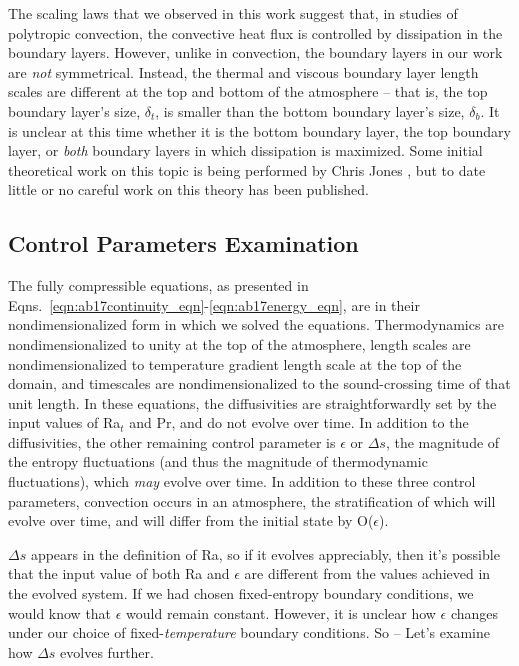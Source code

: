 The scaling laws that we observed in this work suggest that, in studies of polytropic convection, the convective heat flux is controlled by dissipation in the boundary layers.
However, unlike in \RB convection, the boundary layers in our work are \emph{not} symmetrical.
Instead, the thermal and viscous boundary layer length scales are different at the top and bottom of the atmosphere -- that is, the top boundary layer's size, $\delta_t$, is smaller than the bottom boundary layer's size, $\delta_b$.
It is unclear at this time whether it is the bottom boundary layer, the top boundary layer, or \emph{both} boundary layers in which dissipation is maximized.
Some initial theoretical work on this topic is being performed by Chris Jones \citep[as presented in ][]{jones&all2019}, but to date little or no careful work on this theory has been published.

\subsection{Control Parameters Examination}
The fully compressible equations, as presented in Eqns.~\ref{eqn:ab17continuity_eqn}-\ref{eqn:ab17energy_eqn}, are in their nondimensionalized form in which we solved the equations.
Thermodynamics are nondimensionalized to unity at the top of the atmosphere, length scales are nondimensionalized to temperature gradient length scale at the top of the domain, and timescales are nondimensionalized to the sound-crossing time of that unit length.
In these equations, the diffusivities are straightforwardly set by the input values of Ra$_t$ and Pr, and do not evolve over time.
In addition to the diffusivities, the other remaining control parameter is $\epsilon$ or $\Delta s$, the magnitude of the entropy fluctuations (and thus the magnitude of thermodynamic fluctuations), which \emph{may} evolve over time.
In addition to these three control parameters, convection occurs in an atmosphere, the stratification of which will evolve over time, and will differ from the initial state by O($\epsilon$).

$\Delta s$ appears in the definition of Ra, so if it evolves appreciably, then it's possible that the input value of both Ra and $\epsilon$ are different from the values achieved in the evolved system.
If we had chosen fixed-entropy boundary conditions, we would know that $\epsilon$ would remain constant.
However, it is unclear how $\epsilon$ changes under our choice of fixed-\emph{temperature} boundary conditions.
So -- Let's examine how $\Delta s$ evolves further.

